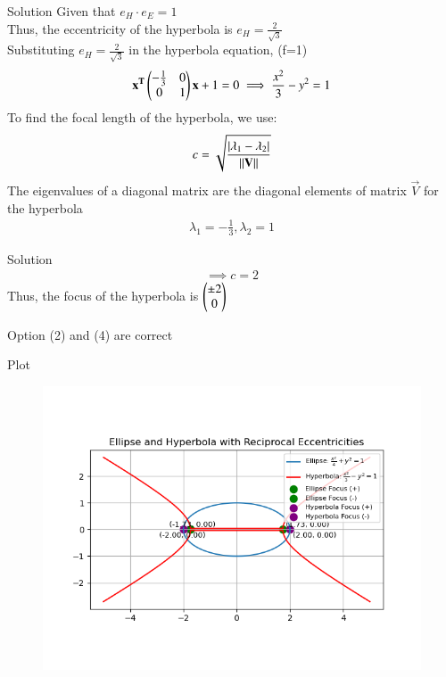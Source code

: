 \documentclass{beamer}
\begin{document}
\begin{frame}{Solution}
Given that $e_H\cdot e_E = 1$\\
Thus, the eccentricity of the hyperbola is $e_H = \frac{2}{\sqrt{3}}$\\

Substituting $e_H=\frac{2}{\sqrt{3}}$ in the hyperbola equation, (f=1) 
\begin{align}
\mathbf{x^T}\begin{pmatrix}-\frac{1}{3} & 0 \\ 0 & 1\end{pmatrix}\mathbf{x} + 1 = 0 \implies \frac{x^2}{3} - y^2 = 1
\end{align}
To find the focal length of the hyperbola, we use:
\begin{align}
c = \sqrt{\frac{\left\vert\lambda_1 - \lambda_2\right\vert}{\left\lVert\mathbf{V}\right\rVert}}
\end{align}
The eigenvalues of a diagonal matrix are the diagonal elements of matrix $\vec{V}$ for the hyperbola
\begin{align}
\lambda_1 = -\frac{1}{3} , \lambda_2 = 1
\end{align}
\end{frame}

\begin{frame}{Solution}
\begin{align}
\implies c = 2
\end{align}
Thus, the focus of the hyperbola is $\begin{pmatrix}\pm 2 \\ 0\end{pmatrix}$

Option (2) and (4) are correct
\end{frame}
\begin{frame}{Plot}
\begin{figure}[h!]
    \centering
    \includegraphics[height=0.5\textheight, keepaspectratio]{figs/Figure_1.png}
\end{figure}    
\end{frame}
\end{document}
